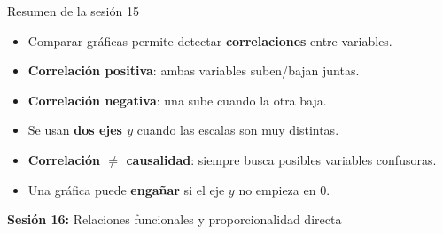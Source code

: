 \documentclass[aspectratio=169, 10pt, spanish]{beamer}
\begin{document}
\begin{frame}{Resumen de la sesión 15}
  \begin{resumenbox}
    \begin{itemize}
      \item Comparar gráficas permite detectar
            \textbf{correlaciones} entre variables.
      \item \textbf{Correlación positiva}: ambas variables
            suben/bajan juntas.
      \item \textbf{Correlación negativa}: una sube cuando
            la otra baja.
      \item Se usan \textbf{dos ejes $y$} cuando las escalas
            son muy distintas.
      \item \textbf{Correlación $\neq$ causalidad}:
            siempre busca posibles variables confusoras.
      \item Una gráfica puede \textbf{engañar} si el eje $y$
            no empieza en $0$.
    \end{itemize}
  \end{resumenbox}
  \vspace{6pt}
  \begin{center}
    {\AlmFontSmall\color{AlmAzulM}\faArrowCircleRight\enskip
    \textbf{Sesión 16:} Relaciones funcionales y proporcionalidad directa}
  \end{center}
\end{frame}
\end{document}
